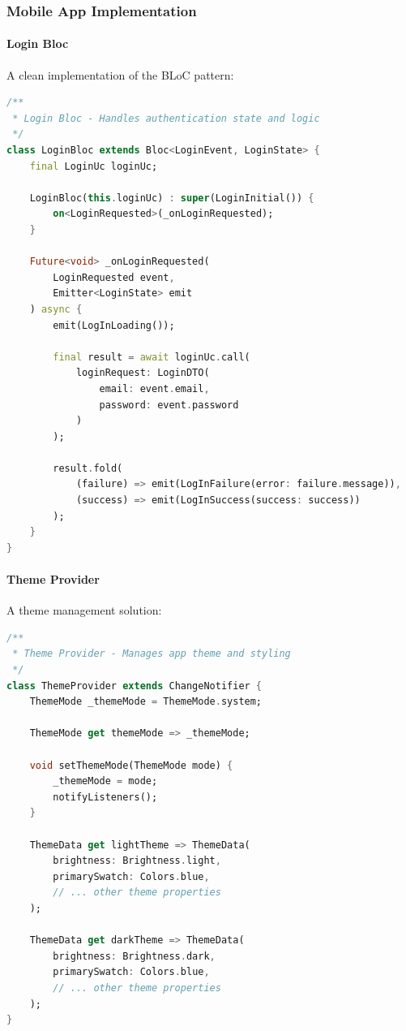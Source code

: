 \subsubsection{Mobile App Implementation}
\label{subsubsec:mobile_examples}

\paragraph{Login Bloc}
A clean implementation of the BLoC pattern:

\begin{lstlisting}[language=Dart, caption={Login Bloc Implementation}]
/**
 * Login Bloc - Handles authentication state and logic
 */
class LoginBloc extends Bloc<LoginEvent, LoginState> {
    final LoginUc loginUc;
    
    LoginBloc(this.loginUc) : super(LoginInitial()) {
        on<LoginRequested>(_onLoginRequested);
    }

    Future<void> _onLoginRequested(
        LoginRequested event,
        Emitter<LoginState> emit
    ) async {
        emit(LogInLoading());
        
        final result = await loginUc.call(
            loginRequest: LoginDTO(
                email: event.email,
                password: event.password
            )
        );
        
        result.fold(
            (failure) => emit(LogInFailure(error: failure.message)),
            (success) => emit(LogInSuccess(success: success))
        );
    }
}
\end{lstlisting}

\paragraph{Theme Provider}
A theme management solution:

\begin{lstlisting}[language=Dart, caption={Theme Provider Implementation}]
/**
 * Theme Provider - Manages app theme and styling
 */
class ThemeProvider extends ChangeNotifier {
    ThemeMode _themeMode = ThemeMode.system;
    
    ThemeMode get themeMode => _themeMode;
    
    void setThemeMode(ThemeMode mode) {
        _themeMode = mode;
        notifyListeners();
    }
    
    ThemeData get lightTheme => ThemeData(
        brightness: Brightness.light,
        primarySwatch: Colors.blue,
        // ... other theme properties
    );
    
    ThemeData get darkTheme => ThemeData(
        brightness: Brightness.dark,
        primarySwatch: Colors.blue,
        // ... other theme properties
    );
}
\end{lstlisting}

